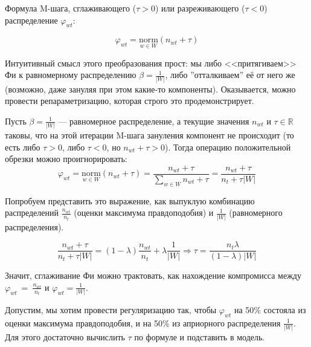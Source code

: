 \documentclass[12pt,twoside]{article}
\begin{document}
	Формула M-шага, сглаживающего ($\tau > 0$) или разреживающего ($\tau < 0$) распределение
	$\varphi_{wt}$:
	
	\begin{equation}
	\varphi_{wt} = \underset{w \in W}{\text{norm}} \left(n_{wt} + \tau \right)
	\end{equation}
	
	
	Интуитивный смысл этого преобразования прост: мы либо <<притягиваем>> Фи к равномерному распределению $\beta = \frac{1}{|W|}$, либо ”отталкиваем” её от него же (возможно, даже
	зануляя при этом какие-то компоненты).
	Оказывается, можно провести репараметризацию, которая строго это продемонстрирует.
	
	Пусть $\beta = \frac{1}{|W|}$ — равномерное распределение, а текущие значения $n_{wt}$ и $\tau \in \mathbb {R}$ таковы, что на этой итерации M-шага зануления компонент не происходит (то есть либо $\tau > 0$,
	либо $\tau < 0$, но $n_{wt} + \tau > 0$).
	Тогда операцию положительной обрезки можно проигнорировать:
	\begin{equation}
	\varphi_{wt} = \underset{w \in W}{\text{norm}} \left(n_{wt} + \tau \right) = \frac{n_{wt} + \tau}{\sum\limits_{w \in W} n_{wt} + \tau} = \frac{n_{wt} + \tau}{n_{t} + \tau |W|}
	\end{equation}
	
	Попробуем представить это выражение, как выпуклую комбинацию распределений $\frac{n_{wt}}
	{n_t}$ (оценки максимума правдоподобия) и $\frac{1}{|W|}$ (равномерного распределения).
	
	\begin{equation}
	\frac{n_{wt} + \tau}{n_{t} + \tau |W|} = (1 - \lambda)\frac{n_{wt}}{n_t} + \lambda \frac{1}{|W|} 
	\Rightarrow
	\tau = \frac{n_t\lambda}{(1 - \lambda)|W|}
	\end{equation}
	
	Значит, сглаживание Фи можно трактовать, как нахождение компромисса между $\varphi_{wt}$~=~$\frac{n_{wt}}
	{n_t}$ и $\varphi_{wt} = \frac{1}{|W|}$.
	
	Допустим, мы хотим провести регуляризацию так, чтобы $\varphi_{wt}$ на 50\% состояла из оценки максимума правдоподобия, и на 50\% из априорного
	распределения $\frac{1}{|W|}$. Для этого достаточно вычислить $\tau$ по формуле и подставить в модель.
	
\end{document}
